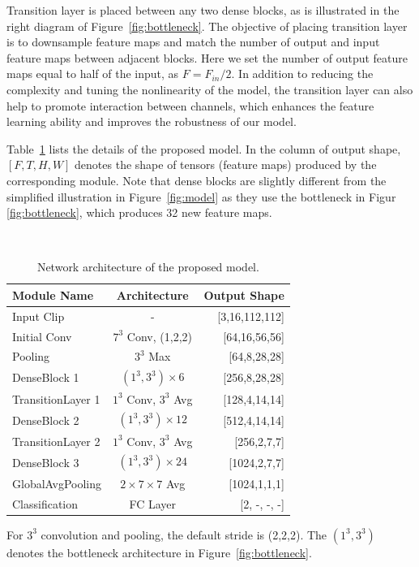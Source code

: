 \documentclass[10pt,twocolumn,letterpaper]{article}
\begin{document}
Transition layer is placed between any two dense blocks, as is illustrated in the right diagram of Figure~\ref{fig:bottleneck}.
The objective of placing transition layer is to downsample feature maps and match the number of output and input feature maps between adjacent blocks.
Here we set the number of output feature maps equal to half of the input, as $F = F_{in}/2$.
In addition to reducing the complexity and tuning the nonlinearity of the model, the transition layer can also help to promote interaction between channels, which enhances the feature learning ability and improves the robustness of our model.

Table~\ref{table:arch} lists the details of the proposed model.
In the column of output shape, $[F, T, H, W]$ denotes the shape of tensors (feature maps) produced by the corresponding module.
Note that dense blocks are slightly different from the simplified illustration in Figure~\ref{fig:model} as they use the bottleneck in Figur~ \ref{fig:bottleneck}, which produces 32 new feature maps. 


\begin{table}[t]
\begin{center}
\caption{Network architecture of the proposed model.}
~\label{table:arch}
\begin{tabular}{lcr}
\hline
\textbf{Module Name} & \textbf{Architecture} & \textbf{Output Shape} \\
\hline\hline
Input Clip & - & [3,16,112,112] \\
Initial Conv & $7^3$ Conv, (1,2,2) & [64,16,56,56] \\
Pooling & $3^3$ Max & [64,8,28,28] \\
DenseBlock 1 & $(1^3, 3^3) \times 6$ & [256,8,28,28] \\
TransitionLayer 1 & $1^3$ Conv, $3^3$ Avg & [128,4,14,14]\\
DenseBlock 2 & $(1^3, 3^3) \times 12$ & [512,4,14,14] \\
TransitionLayer 2 & $1^3$ Conv, $3^3$ Avg & [256,2,7,7] \\
DenseBlock 3 & $(1^3, 3^3) \times 24$ & [1024,2,7,7]\\
GlobalAvgPooling & $2 \times 7 \times 7$ Avg & [1024,1,1,1]\\
Classification & FC Layer & [2, -, -, -] \\
\hline
\end{tabular}
\end{center}
\footnotesize
For $3^3$ convolution and pooling, the default stride is (2,2,2). The $(1^3, 3^3)$ denotes the bottleneck architecture in Figure~\ref{fig:bottleneck}.
\end{table}
\end{document}
